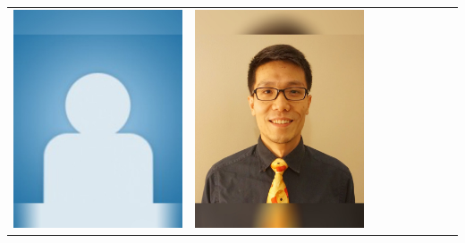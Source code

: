 \documentclass[landscape,a0paper,fontscale=0.292]{baposter}
\begin{document}
\begin{poster}
{\begin{center}
\begin{tabularx}{\linewidth}{X X X X X X X X X}
{\centering \includegraphics[width=0.65\linewidth]{MISSING.jpg}}&
{\centering \includegraphics[width=0.65\linewidth]{liu.jpg}}&

\end{tabularx}
\end{center}}
\end{poster}
\end{document}
